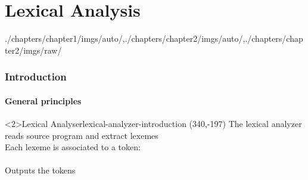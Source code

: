\part[author={\protect\insertauthor}]{Lexical Analysis}
\label{chap:lexical_analysis}

\begin{graphicspathcontext}{{./chapters/chapter1/imgs/auto/},{./chapters/chapter2/imgs/auto/},{./chapters/chapter2/imgs/raw/}}
\begin{bibunit}[apalike]
	
\tableofcontentslide

\section{Introduction}
\sectiontableofcontentslide

\subsection{General principles}

\begin{rightlawnframe}<2>{Lexical Analyser}{lexical-analyzer-introduction}
	\putat*(340,-197){}
	The lexical analyzer reads source program and extract lexemes \\[1cm]
	Each lexeme is associated to a token: \\
	 \\[1cm]
	Outputs the tokens
\end{rightlawnframe}


\end{bibunit}
\end{graphicspathcontext}
